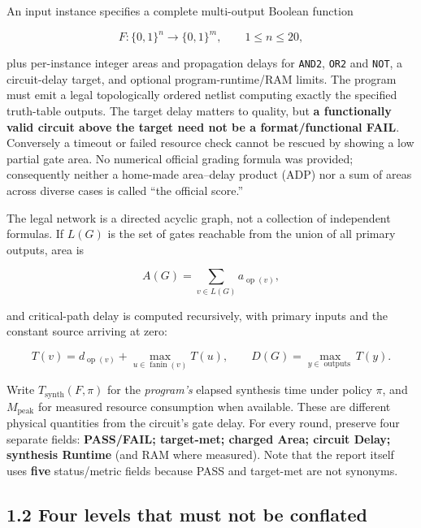 An input instance specifies a complete multi-output Boolean function

\[
F:\{0,1\}^{n}\to\{0,1\}^{m},\qquad 1\le n\le20,
\]

plus per-instance integer areas and propagation delays for \texttt{AND2}, \texttt{OR2} and \texttt{NOT}, a circuit-delay target, and optional program-runtime/RAM limits. The program must emit a legal topologically ordered netlist computing exactly the specified truth-table outputs. The target delay matters to quality, but \textbf{a functionally valid circuit above the target need not be a format/functional FAIL}. Conversely a timeout or failed resource check cannot be rescued by showing a low partial gate area. No numerical official grading formula was provided; consequently neither a home-made area--delay product (ADP) nor a sum of areas across diverse cases is called ``the official score.''

The legal network is a directed acyclic graph, not a collection of independent formulas. If \(L(G)\) is the set of gates reachable from the union of all primary outputs, area is

\[
A(G)=\sum_{v\in L(G)} a_{\operatorname{op}(v)},
\]

and critical-path delay is computed recursively, with primary inputs and the constant source arriving at zero:

\[
T(v)=d_{\operatorname{op}(v)}+\max_{u\in\operatorname{fanin}(v)}T(u),
\qquad D(G)=\max_{y\in\operatorname{outputs}}T(y).
\]

Write \(T_{\mathrm{synth}}(F,\pi)\) for the \emph{program's} elapsed synthesis time under policy \(\pi\), and \(M_{\mathrm{peak}}\) for measured resource consumption when available. These are different physical quantities from the circuit's gate delay. For every round, preserve four separate fields: \textbf{PASS/FAIL; target-met; charged Area; circuit Delay; synthesis Runtime} (and RAM where measured). Note that the report itself uses \textbf{five} status/metric fields because PASS and target-met are not synonyms.

\subsection{1.2 Four levels that must not be conflated}\label{four-levels-that-must-not-be-conflated}

